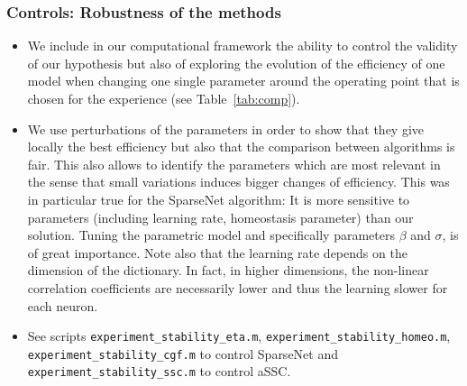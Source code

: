 \documentclass[a4]{beamer}%
\begin{document}
\begin{frame}\frametitle{Controls: Robustness of the methods}%
\label{ann:robust}%

{\scriptsize
%
\begin{itemize}
  \item We include in our computational framework the ability to control the validity of our hypothesis but also of exploring the evolution of the efficiency of one model when changing one single parameter around the operating point that is chosen for the experience (see Table~\ref{tab:comp}). 
    \item We use perturbations of the parameters in order to show that they give locally the best efficiency but also that the comparison between algorithms is fair. This also allows to identify the parameters which are most relevant in the sense that small variations induces bigger changes of efficiency. This was in particular true for the {\sc SparseNet} algorithm: It is more sensitive to parameters (including learning rate, homeostasis parameter) than our solution. Tuning the parametric model and specifically parameters $\beta$ and $\sigma$, is of great importance. Note also that the learning rate depends on the dimension of the dictionary. In fact, in higher dimensions, the non-linear correlation coefficients are necessarily lower and thus the learning slower for each neuron. 
      \item See scripts \texttt{experiment\_stability\_eta.m}, \texttt{experiment\_stability\_homeo.m}, \texttt{experiment\_stability\_cgf.m}  to control {\sc SparseNet} and \texttt{experiment\_stability\_ssc.m}  to control aSSC. %
\end{itemize}

}

\end{frame}%
\end{document}
